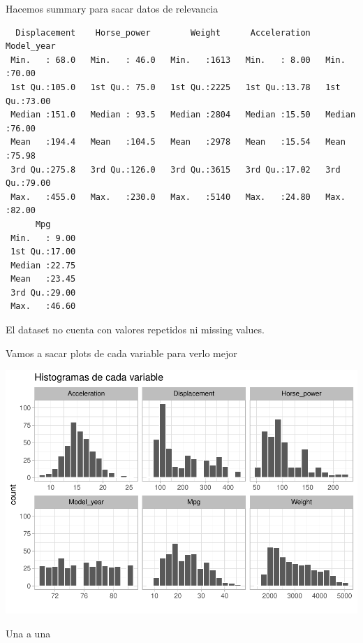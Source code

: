 Hacemos summary para sacar datos de relevancia

\begin{verbatim}
  Displacement    Horse_power        Weight      Acceleration     Model_year   
 Min.   : 68.0   Min.   : 46.0   Min.   :1613   Min.   : 8.00   Min.   :70.00  
 1st Qu.:105.0   1st Qu.: 75.0   1st Qu.:2225   1st Qu.:13.78   1st Qu.:73.00  
 Median :151.0   Median : 93.5   Median :2804   Median :15.50   Median :76.00  
 Mean   :194.4   Mean   :104.5   Mean   :2978   Mean   :15.54   Mean   :75.98  
 3rd Qu.:275.8   3rd Qu.:126.0   3rd Qu.:3615   3rd Qu.:17.02   3rd Qu.:79.00  
 Max.   :455.0   Max.   :230.0   Max.   :5140   Max.   :24.80   Max.   :82.00  
      Mpg       
 Min.   : 9.00  
 1st Qu.:17.00  
 Median :22.75  
 Mean   :23.45  
 3rd Qu.:29.00  
 Max.   :46.60  
\end{verbatim}

El dataset no cuenta con valores repetidos ni missing values.


Vamos a sacar plots de cada variable para verlo mejor

\begin{center}\includegraphics{img/EDA_files/figure-latex/unnamed-chunk-6-1} \end{center}

Una a una

